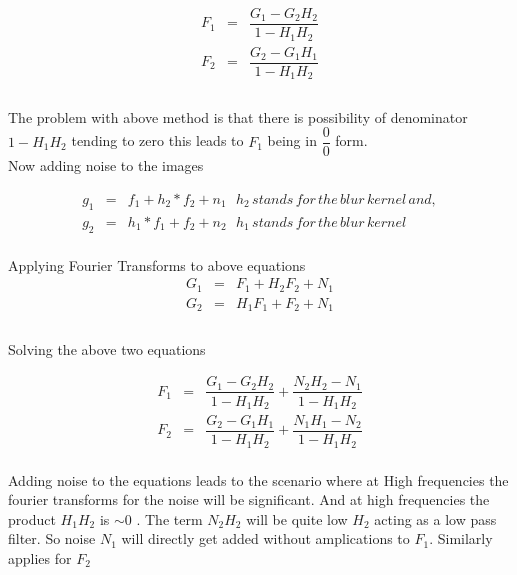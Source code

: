 \documentclass[11pt]{article}
\begin{document}
\begin{eqnarray*}
F_1 &=& \dfrac{G_1 -G_2 H_2}{1 - H_1 H_2}\\
F_2 &=& \dfrac{G_2 -G_1 H_1}{1 - H_1 H_2}\\
\end{eqnarray*}
\\

The problem with above method is that there is possibility of denominator $1- H_1 H_2$ tending to zero this leads to $F_1$ being in $\dfrac{0}{0}$ form.
\\
Now adding noise to the images

\begin{eqnarray*}
g_1 &=& f_1 + h_2 * f_2 + n_1\:\:\: h_2\, stands\, for\, the\, blur\, kernel\, and,\\
g_2 &=& h_1 * f_1 + f_2 + n_2\:\:\: h_1\, stands\, for\, the\, blur\, kernel\, \\
\end{eqnarray*}

Applying Fourier Transforms to above equations\\
\begin{eqnarray*}
G_1 &=& F_1 + H_2 F_2 + N_1 \\
G_2 &=& H_1 F_1 + F_2 + N_1\\
\end{eqnarray*}
\\
Solving the above two equations 

\begin{eqnarray*}
F_1 &=& \dfrac{G_1 -G_2 H_2}{1 - H_1 H_2} + \dfrac{N_2 H_2 - N_1}{1 - H_1 H_2}\\
F_2 &=& \dfrac{G_2 -G_1 H_1}{1 - H_1 H_2} + \dfrac{N_1 H_1 - N_2}{1 - H_1 H_2}\\
\end{eqnarray*}

Adding noise to the equations leads to the scenario where at High frequencies the fourier transforms for the noise will be significant. And at high frequencies the product $H_1H_2$ is $\sim 0$ . The term $N_2 H_2$ will be quite low $H_2$ acting as a low pass filter. So noise $N_1$ will directly get added without amplications to $F_1$. Similarly applies for $F_2$
\end{document}
